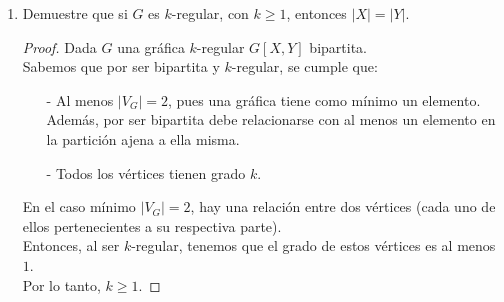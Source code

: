 \documentclass{article}
\begin{document}
\begin{enumerate}
\begin{enumerate}
\begin{proof}
\begin{itemize}
        Supongamos que $G[X, Y_k]$ es una gr\'afica
        bipartita y $\sum_{v \in X}d(v) = \sum_{v \in Y_k}d(v)$. 
        
      \item PASO INDUCTIVO: $(n=k+1)$

        Sea $G[X,Y_{k+1}]$ funci\'on bipartita. \\
        Demostraremos que $\sum_{v \in X} d(v) = \sum_{v \in Y_{k+1}}d(v)$.

        Por hip\'otesis de inducci\'on, tenemos que $\sum_{v \in X}d(v) =
        \sum_{v \in Y_k}d(v)$. Luego, si agregamos un v\'ertice a Y$_k$,
        tenemos que $|Y_k|+1 = |Y_{k+1}|$. \\
        Por defici\'on de gr\'afica bipartita, existir\'an v\'ertices de $X$ que son adyacentes
        con el nuevo v\'ertice en $Y$. \\
        Sea $q$ el número de nuevas relaciones entre $X$ y el nuevo v\'ertice en $Y$. \\
        Vemos que el grado del nuevo v\'ertice en $Y$ es igual a $q$. \\
        Entonces:
        $$\sum_{v \in X} d(v) = \sum_{v \in Y_k}d(v) + q =  \sum_{v \in Y_{k+1}}d(v)$$
      \end{itemize}

      Por lo tanto, para toda $G$ tenemos que $\sum_{v \in X}d(v) = \sum_{v \in Y}d(v)$.
    \end{proof}

  \item Demuestre que si $G$ es $k$-regular, con $k \ge 1$, entonces
    $|X| = |Y|$.

    \begin{proof}
      Dada $G$ una gr\'afica $k$-regular $G[X,Y]$ bipartita. \\
      Sabemos que por ser bipartita y $k$-regular, se cumple que:

      \begin{itemize}
      \item[-] Al menos $|V_G|=2$, pues una gr\'afica tiene como m\'inimo
        un elemento. Adem\'as, por ser bipartita debe relacionarse con al
        menos un elemento en la partici\'on ajena a ella misma.

      \item[-] Todos los v\'ertices tienen grado $k$.
      \end{itemize}

      En el caso mínimo $|V_G| = 2$, hay una relaci\'on entre
      dos v\'ertices (cada uno de ellos pertenecientes a su respectiva
      parte). \\
      Entonces, al ser $k$-regular, tenemos que el grado
      de estos v\'ertices es al menos $1$. \\
      Por lo tanto, $k \geq 1$.


\end{proof}
\end{enumerate}
\end{enumerate}
\end{document}
